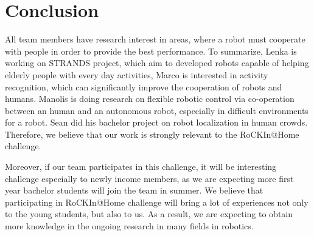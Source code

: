 \documentclass[conference]{IEEEtran}
\begin{document}

\section{Conclusion}
All team members have research interest in areas, where a robot must cooperate with people in order to provide the best performance. To summarize, Lenka is working on STRANDS project, which aim to developed robots capable of helping elderly people with every day activities, Marco is interested in activity recognition, which can significantly improve the cooperation of robots and humans. Manolis is doing research on flexible robotic control via co-operation between an human and an autonomous robot, especially in difficult environments for a robot. Sean did his bachelor project on robot localization in human crowds. Therefore, we believe that our work is strongly relevant to the RoCKIn@Home challenge.

Moreover, if our team participates in this challenge, it will be interesting challenge especially to newly income members, as we are expecting more first year bachelor students will join the team in summer. We believe that participating in RoCKIn@Home challenge will bring a lot of experiences not only to the young students, but also to us. As a result, we are expecting to obtain more knowledge in the ongoing research in many fields in robotics.








\end{document}
